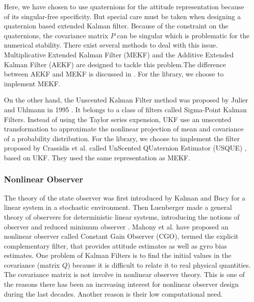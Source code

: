 Here, we have chosen to use quaternions for the attitude representation because of its singular-free specificity. But special care must be taken when designing a quaternion based extended Kalman filter. Because of the constraint on the quaternions, the covariance matrix $P$ can be singular \cite{vik2009integrated} which is problematic for the numerical stability. There exist several methods to deal with this issue. Multiplicative Extended Kalman Filter (MEKF)\cite{markley2003attitude} and the Additive Extended Kalman Filter (AEKF) \cite{bar1991quaternion} are designed to tackle this problem.The difference between AEKF and MEKF is discussed in \cite{markley_multiplicative_2004}. For the library, we choose to implement MEKF.

On the other hand, the Unscented Kalman Filter method was proposed by Julier and Uhlmann \cite{julier_new_1995} in 1995 . It belongs to a class of filters called Sigma-Point Kalman Filters. Instead of using the Taylor series expension, UKF use an unscented transformation \cite{uhlmann1995dynamic} to approximate the nonlinear projection of mean and covariance of a probability distribution. For the library, we choose to implement the filter proposed by Crassidis et al. called UnScented QUaternion Estimator (USQUE) \cite{crassidis_unscented_2003}, based on UKF. They used the same representation as MEKF.

\subsubsection{Nonlinear Observer}

The theory of the state observer was first introduced by Kalman and Bucy for a linear system in a stochastic environment. Then Luenberger \cite{david1971introduction} made a general theory of observers for deterministic linear systems, introducing the notions of observer and reduced minimum observer \cite{primbs1996survey}. Mahony et al. \cite{mahony_nonlinear_2008} have proposed an nonlinear observer called Constant Gain Observer (CGO), termed the explicit complementary filter, that provides attitude estimates as well as gyro bias estimates. One problem of Kalman Filters is to find the initial values in the covariance (matrix $Q$) because it is difficult to relate it to real physical quantities. The covariance matrix is not involve in nonlinear observer theory. This is one of the reasons there has been an increasing interest for nonlinear observer design during the last decades. Another reason is their low computational need.

